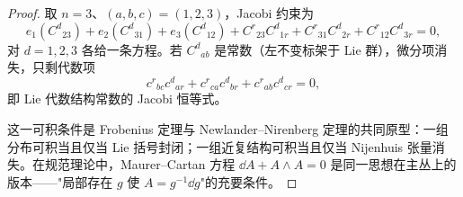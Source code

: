 \begin{proof}
取 $n=3$、$(a,b,c)=(1,2,3)$，Jacobi 约束为
\begin{equation*}
 e_1(C^d{}_{23})+e_2(C^d{}_{31})+e_3(C^d{}_{12})
 +C^r{}_{23}C^d{}_{1r}
 +C^r{}_{31}C^d{}_{2r}
 +C^r{}_{12}C^d{}_{3r}=0,
\end{equation*}
对 $d=1,2,3$ 各给一条方程。若 $C^d{}_{ab}$ 是常数（左不变标架于 Lie 群），微分项消失，只剩代数项
\begin{equation*}
 c^r{}_{bc}c^d{}_{ar}+c^r{}_{ca}c^d{}_{br}+c^r{}_{ab}c^d{}_{cr}=0,
\end{equation*}
即 Lie 代数结构常数的 Jacobi 恒等式。

这一可积条件是 Frobenius 定理与 Newlander--Nirenberg 定理的共同原型：一组分布可积当且仅当 Lie 括号封闭；一组近复结构可积当且仅当 Nijenhuis 张量消失。在规范理论中，Maurer--Cartan 方程 $\dd A+A\wedge A=0$ 是同一思想在主丛上的版本——"局部存在 $g$ 使 $A=g^{-1}\dd g$"的充要条件。
\end{proof}
